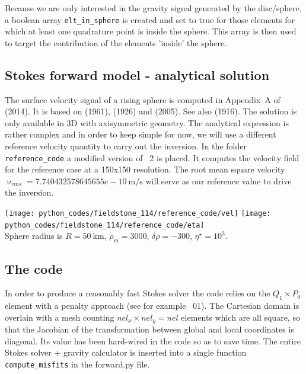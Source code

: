 Because we are only interested in the gravity signal generated by the disc/sphere, 
a boolean array {\tt elt\_in\_sphere} is created and set to true for those elements
for which at least one quadrature point is inside the sphere. This array is then used
to target the contribution of the elements 'inside' the sphere. 



\subsection*{Stokes forward model - analytical solution}

The surface velocity signal of a rising sphere is computed in Appendix~A of \textcite{bakp14} (2014).
It is based on \textcite{bren61} (1961), \textcite{stje26} (1926) and \textcite{pacy05} (2005). See also 
\textcite{burg16} (1916). The solution is only available in 3D with axisymmetric geometry. 
The analytical expression is rather complex and in order to keep simple for now, we
will use a different reference velocity quantity to carry out the inversion. 
In the folder {\tt reference\_code} a modified version of \stone~2 is placed. 
It computes the velocity field for the reference case
at a 150x150 resolution. The root mean square velocity 
$\upnu_{rms}=7.740432578645655e-10~\si{\meter\per\second}$ 
will serve as our reference value to drive the inversion.

\begin{center}
\texttt{[image: python\_codes/fieldstone\_114/reference\_code/vel]}
\texttt{[image: python\_codes/fieldstone\_114/reference\_code/eta]}\\
{\captionfont Sphere radius is $R=50~\si{\km}$, $\rho_m=3000$, $\delta\rho=-300$, $\eta^\star=10^3$.}
\end{center}

\subsection*{The code}

In order to produce a reasonably fast Stokes solver the code relies on 
the $Q_1\times P_0$ element with a penalty approach (see for example \stone~01).
The Cartesian domain is overlain with a mesh counting $nel_x\times nel_y=nel$
elements which are all square, so that the Jacobian of the transformation
between global and local coordinates is diagonal. Its value has been 
hard-wired in the code so as to save time. 
The entire Stokes solver + gravity calculator is inserted into a single function
{\tt compute\_misfits} in the {\pythonfile forward.py} file.

